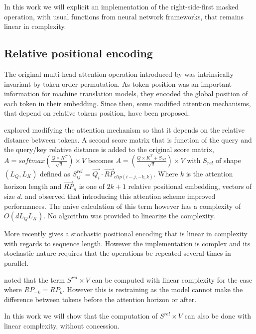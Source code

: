 In this work we will explicit an implementation of the right-side-first masked operation, with usual functions from neural network frameworks, that remains linear in complexity.

\subsection{Relative positional encoding}

The original multi-head attention operation introduced by
\citet{vaswani2017attention} was
intrinsically invariant by token order permutation. As token position was
an important information for machine translation models, they encoded
the global position of each token in their embedding. Since then, some
modified attention mechanisms, that depend on relative tokens position,
have been proposed.

\citet{shaw2018selfattention} explored
modifying the attention mechanism so that it depends on the relative
distance between tokens. A second score matrix that is function of the
query and the query/key relative distance is added to the original score
matrix, $A = softmax\left(\frac{Q \times K^T}{\sqrt{d}}\right) \times V$ becomes
$A = \left(\frac{Q \times K^T + S_{rel}}{\sqrt{d}}\right) \times V$ with $S_{rel}$ of shape $(L_Q, L_K)$ defined as
$S^{rel}_{ij} = \vec{Q_i} \cdotp \vec{RP}_{clip(i-j, -k, k)}$. Where $k$ is the attention horizon length and $\vec{RP}_n$ is one of
$2k+1$ relative positional embedding, vectors of size $d$.
\citet{shaw2018selfattention} and
\citet{huang2018music} observed that introducing this attention scheme improved performances.
The naive calculation of this term however has a complexity of
$O(dL_QL_K)$. No algorithm was provided to linearize the complexity.

More recently \citet{liutkus2021relative} gives a stochastic positional encoding that is linear in
complexity with regards to sequence length. However the implementation
is complex and its stochastic nature requires that the operations be
repeated several times in parallel.

\citet{horn2021translational} noted that
the term $S^{rel} \times V$ can be computed with linear complexity for
the case where $RP_{-k} = RP_{k}$. However this is restraining as the
model cannot make the difference between tokens before the attention
horizon or after.

In this work we will show that the computation of $S^{rel} \times V$
can also be done with linear complexity, without concession.

\endinput
